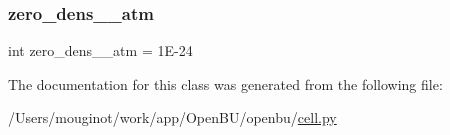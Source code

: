 \mbox{\label{classopenbu_1_1cell_1_1_cell_afd182b1f7a0ae4eced99cb9a50623055}} 
\subsubsection{\texorpdfstring{zero\+\_\+dens\+\_\+\_\+atm}{zero\_dens\_1\_atm}}
{\footnotesize\ttfamily int zero\+\_\+dens\+\_\+\_\+atm = 1\+E-\/24\hspace{0.3cm}{\ttfamily [static]}}



The documentation for this class was generated from the following file\+:\begin{DoxyCompactItemize}
\item 
/\+Users/mouginot/work/app/\+Open\+B\+U/openbu/\mbox{\hyperlink{cell_8py}{cell.\+py}}\end{DoxyCompactItemize}
